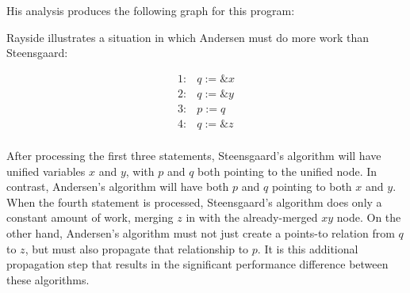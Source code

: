\documentclass[11pt]{article}
\newcommand{\todo}[1]{}
\begin{document}
\begin{sloppypar}
His analysis produces the following graph for this program:






Rayside illustrates a situation in which Andersen must do more work than Steensgaard:

\todo{Cite Rayside notes}

\[
\begin{array}{ll}
1: & q := \&x\\
2: & q := \&y\\
3: & p := q\\
4: & q := \&z\\
\end{array}
\]

After processing the first three statements, Steensgaard's algorithm will have unified variables $x$ and $y$, with $p$ and $q$ both pointing to the unified node.  In contrast, Andersen's algorithm will have both $p$ and $q$ pointing to both $x$ and $y$.  When the fourth statement is processed, Steensgaard's algorithm does only a constant amount of work, merging $z$ in with the already-merged $xy$ node.  On the other hand, Andersen's algorithm must not just create a points-to relation from $q$ to $z$, but must also propagate that relationship to $p$.  It is this additional propagation step that results in the significant performance difference between these algorithms.


\end{sloppypar}
\end{document}
